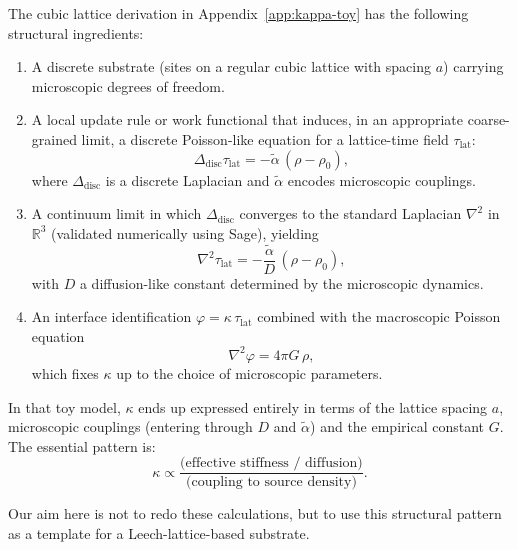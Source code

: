 The cubic lattice derivation in Appendix~\ref{app:kappa-toy} has the following
structural ingredients:
\begin{enumerate}
  \item A discrete substrate (sites on a regular cubic lattice with spacing
        $a$) carrying microscopic degrees of freedom.
  \item A local update rule or work functional that induces, in an appropriate
        coarse-grained limit, a discrete Poisson-like equation for a
        lattice-time field $\tau_{\mathrm{lat}}$:
        \begin{equation}
          \Delta_{\text{disc}} \tau_{\mathrm{lat}} =
          -\tilde{\alpha}\, (\rho - \rho_0),
        \end{equation}
        where $\Delta_{\text{disc}}$ is a discrete Laplacian and
        $\tilde{\alpha}$ encodes microscopic couplings.
  \item A continuum limit in which $\Delta_{\text{disc}}$ converges to the
        standard Laplacian $\nabla^2$ in $\mathbb{R}^3$ (validated
        numerically using Sage), yielding
        \begin{equation}
          \nabla^2 \tau_{\mathrm{lat}} =
          -\frac{\tilde{\alpha}}{D} \, (\rho - \rho_0),
        \end{equation}
        with $D$ a diffusion-like constant determined by the microscopic
        dynamics.
  \item An interface identification $\varphi = \kappa\,\tau_{\mathrm{lat}}$
        combined with the macroscopic Poisson equation
        \begin{equation}
          \nabla^2 \varphi = 4\pi G\,\rho,
        \end{equation}
        which fixes $\kappa$ up to the choice of microscopic parameters.
\end{enumerate}

In that toy model, $\kappa$ ends up expressed entirely in terms of the lattice
spacing $a$, microscopic couplings (entering through $D$ and $\tilde{\alpha}$)
and the empirical constant $G$. The essential pattern is:
\begin{equation}
  \kappa \propto \frac{\text{(effective stiffness / diffusion)}}
                       {\text{(coupling to source density)}}.
\end{equation}

Our aim here is not to redo these calculations, but to use this structural
pattern as a template for a Leech-lattice-based substrate.

